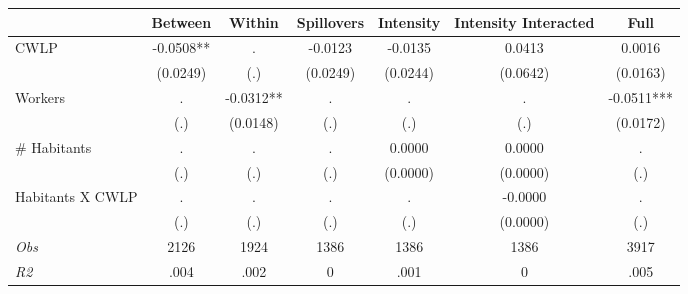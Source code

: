 \begin{tabular}{l*{6}{c}}\hline&\multicolumn{1}{c}{Between}&\multicolumn{1}{c}{Within}&\multicolumn{1}{c}{Spillovers}&\multicolumn{1}{c}{Intensity}&\multicolumn{1}{c}{Intensity Interacted}&\multicolumn{1}{c}{Full}\\ \hline 
CWLP & -0.0508** & . & -0.0123 & -0.0135 & 0.0413 & 0.0016 \\
 & (0.0249) & (.) & (0.0249) & (0.0244) & (0.0642) & (0.0163) \\
Workers & . & -0.0312** & . & . & . & -0.0511*** \\
 & (.) & (0.0148) & (.) & (.) & (.) & (0.0172) \\
\# Habitants & . & . & . & 0.0000 & 0.0000 & . \\
 & (.) & (.) & (.) & (0.0000) & (0.0000) & (.) \\
Habitants X CWLP & . & . & . & . & -0.0000 & . \\
 & (.) & (.) & (.) & (.) & (0.0000) & (.) \\
\hline \textit{Obs} & 2126 & 1924 & 1386 & 1386 & 1386 & 3917 \\ \textit{R2} & .004 & .002 & 0 & .001 & 0 & .005 \\ \hline \end{tabular}

